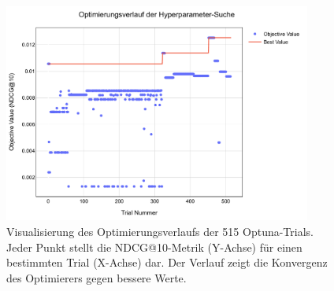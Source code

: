 
\begin{figure}[htbp]
    \centering
    \includegraphics[width=0.9\textwidth]{content/figures/svg/optimierungsverlauf.pdf}
    \caption{Visualisierung des Optimierungsverlaufs der 515 Optuna-Trials. Jeder Punkt stellt die NDCG@10-Metrik (Y-Achse) für einen bestimmten Trial (X-Achse) dar. Der Verlauf zeigt die Konvergenz des Optimierers gegen bessere Werte.}
    \label{fig:optimierungsverlauf}
\end{figure}